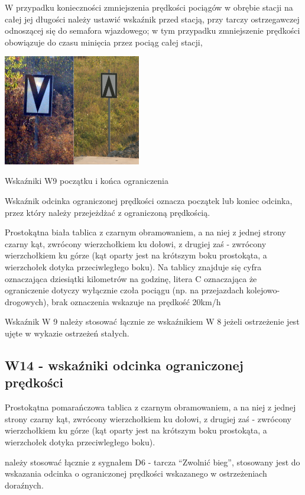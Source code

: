 W przypadku konieczności zmniejszenia prędkości pociągów w obrębie stacji na całej jej długości należy ustawić wskaźnik przed stacją, przy tarczy ostrzegawczej odnoszącej się do semafora wjazdowego; w tym przypadku zmniejszenie prędkości obowiązuje do czasu minięcia przez pociąg całej stacji,
	\begin{marginfigure}
	\includegraphics[width=6cm]{skryptkierownik-img/wskazniki-w9.jpg}
	\caption{Wskaźniki W9 początku i końca ograniczenia}
\end{marginfigure}
\begin{tcolorbox}[colback=black!5!white,colframe=white!55!black,title=Wskaźnik W9]
{\textquotedbl}Wskaźnik odcinka ograniczonej prędkości{\textquotedbl} oznacza początek lub koniec odcinka, przez który należy przejeżdżać z ograniczoną prędkością.
\end{tcolorbox} Prostokątna biała tablica z czarnym obramowaniem, a na niej z jednej strony czarny kąt, zwrócony wierzchołkiem ku dołowi, z drugiej zaś - zwrócony wierzchołkiem ku górze (kąt oparty jest na krótszym boku prostokąta, a wierzchołek dotyka przeciwległego boku). Na tablicy znajduje się cyfra oznaczająca dziesiątki kilometrów na godzinę, litera C oznaczająca że ograniczenie dotyczy wyłącznie czoła pociągu (np. na przejazdach kolejowo-drogowych), brak oznaczenia wskazuje na prędkość 20km/h

Wskaźnik W 9 należy stosować łącznie ze wskaźnikiem W 8 jeżeli ostrzeżenie jest ujęte w wykazie ostrzeżeń stałych. 

\subsection{W14 - wskaźniki odcinka ograniczonej prędkości}

Prostokątna pomarańczowa tablica z czarnym obramowaniem, a na niej z jednej strony czarny kąt, zwrócony wierzchołkiem ku dołowi, z drugiej zaś - zwrócony wierzchołkiem ku górze (kąt oparty jest na krótszym boku prostokąta, a wierzchołek dotyka przeciwległego boku). 
\begin{tcolorbox}[colback=black!5!white,colframe=white!55!black,title=Wskaźnik W14] należy stosować łącznie z sygnałem D6 - tarcza “Zwolnić bieg”, stosowany jest do wskazania odcinka o ograniczonej prędkości wskazanego w ostrzeżeniach doraźnych. \end{tcolorbox}

